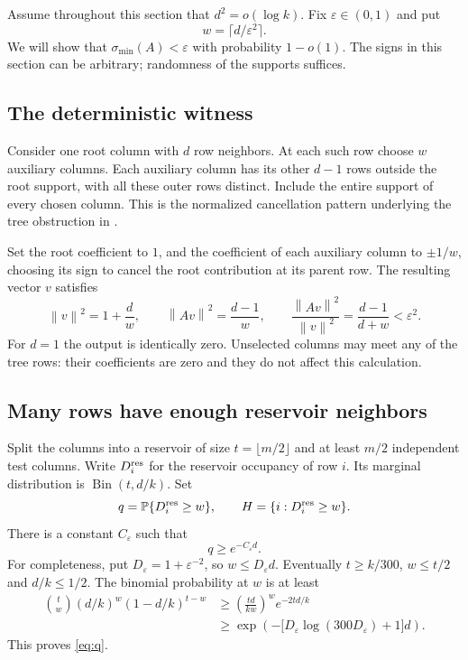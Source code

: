 \documentclass[11pt]{article}
\theoremstyle{definition}
\theoremstyle{remark}
\newcommand{\PP}{\mathbb P}
\newcommand{\smin}{\sigma_{\min}}
\newcommand{\norm}[1]{\left\lVert #1\right\rVert}
\begin{document}
Assume throughout this section that $d^2=o(\log k)$. Fix $\varepsilon\in(0,1)$ and put
\begin{equation}\label{eq:width}
 w=\lceil d/\varepsilon^2\rceil.
\end{equation}
We will show that $\smin(A)<\varepsilon$ with probability $1-o(1)$. The signs in this section can be arbitrary; randomness of the supports suffices.

\subsection{The deterministic witness}

Consider one root column with $d$ row neighbors. At each such row choose $w$ auxiliary columns. Each auxiliary column has its other $d-1$ rows outside the root support, with all these outer rows distinct. Include the entire support of every chosen column. This is the normalized cancellation pattern underlying the tree obstruction in \cite{HRT}.

Set the root coefficient to $1$, and the coefficient of each auxiliary column to $\pm1/w$, choosing its sign to cancel the root contribution at its parent row. The resulting vector $v$ satisfies
\begin{equation}\label{eq:tree-quotient}
 \norm v^2=1+\frac dw,\qquad
 \norm{Av}^2=\frac{d-1}{w},\qquad
 \frac{\norm{Av}^2}{\norm v^2}=\frac{d-1}{d+w}<\varepsilon^2.
\end{equation}
For $d=1$ the output is identically zero. Unselected columns may meet any of the tree rows: their coefficients are zero and they do not affect this calculation.

\subsection{Many rows have enough reservoir neighbors}

Split the columns into a reservoir of size $t=\lfloor m/2\rfloor$ and at least $m/2$ independent test columns. Write $D_i^{\rm res}$ for the reservoir occupancy of row $i$. Its marginal distribution is $\operatorname{Bin}(t,d/k)$. Set
\[
 q=\PP\{D_i^{\rm res}\geq w\},\qquad
 H=\{i:D_i^{\rm res}\geq w\}.
\]
There is a constant $C_\varepsilon$ such that
\begin{equation}\label{eq:q}
 q\geq e^{-C_\varepsilon d}.
\end{equation}
For completeness, put $D_\varepsilon=1+\varepsilon^{-2}$, so $w\leq D_\varepsilon d$. Eventually $t\geq k/300$, $w\leq t/2$ and $d/k\leq1/2$. The binomial probability at $w$ is at least
\begin{align*}
 {t\choose w}(d/k)^w(1-d/k)^{t-w}
 &\geq\left(\frac{td}{kw}\right)^w e^{-2td/k}\\
 &\geq \exp\!\left(-\bigl[D_\varepsilon\log(300D_\varepsilon)+1\bigr]d\right).
\end{align*}
This proves \eqref{eq:q}.
\end{document}
